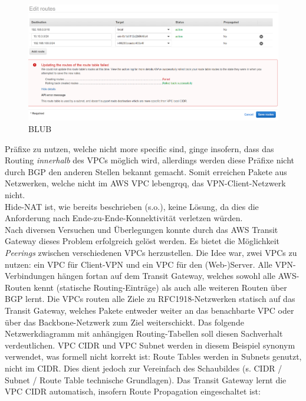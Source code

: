 \begin{figure}[h]
  \centering
  \includegraphics{Figures/more_specific_not_allowed_aws.PNG}
  \caption{BLUB}
  \label{grafik:more_specific_not_allowed_aws}
\end{figure}\FloatBarrier

Präfixe zu nutzen, welche nicht more specific sind, ginge insofern, dass das Routing \textit{innerhalb} des VPCs möglich wird, allerdings werden diese Präfixe nicht durch BGP den anderen Stellen bekannt gemacht. Somit erreichen Pakete aus Netzwerken, welche nicht im AWS VPC \glqq leben{grqq}, das VPN-Client-Netzwerk nicht.\\
Hide-NAT ist, wie bereits beschrieben (s.o.), keine Lösung, da dies die Anforderung nach Ende-zu-Ende-Konnektivität verletzen würden.\\
Nach diversen Versuchen und Überlegungen konnte durch das AWS Transit Gateway dieses Problem erfolgreich gelöst werden. Es bietet die Möglichkeit \textit{Peerings} zwischen verschiedenen VPCs herzustellen. Die Idee war, zwei VPCs zu nutzen: ein VPC für Client-VPN und ein VPC für den (Web-)Server. Alle VPN-Verbindungen hängen fortan auf dem Transit Gateway, welches sowohl alle AWS-Routen kennt (statische Routing-Einträge) als auch alle weiteren Routen über BGP lernt. Die VPCs routen alle Ziele zu RFC1918-Netzwerken statisch auf das Transit Gateway, welches Pakete entweder weiter an das benachbarte VPC oder über das Backbone-Netzwerk zum Ziel weiterschickt. Das folgende Netzwerkdiagramm mit anhängigen Routing-Tabellen soll diesen Sachverhalt verdeutlichen. VPC CIDR und VPC Subnet werden in diesem Beispiel synonym verwendet, was formell nicht korrekt ist: Route Tables werden in Subnets genutzt, nicht im CIDR. Dies dient jedoch zur Vereinfach des Schaubildes (s. CIDR / Subnet / Route Table technische Grundlagen). Das Transit Gateway lernt die VPC CIDR automatisch, insofern Route Propagation eingeschaltet ist:

